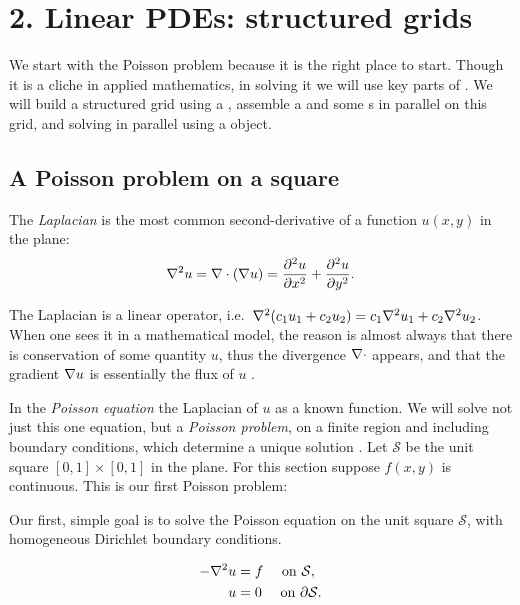
\chapter{2. Linear PDEs: structured grids}

We start with the Poisson problem because it is the right place to start.  Though it is a cliche in applied mathematics, in solving it we will use key parts of \PETSc.  We will build a structured grid using a \PETSc \pDMDA, assemble a \pMat and some \pVec s in parallel on this grid, and solving in parallel using a \pKSP object.

\section{A Poisson problem on a square}

The \emph{Laplacian} is the most common second-derivative of a function $u(x,y)$ in the plane:
    $$\nabla^2 u = \nabla\cdot(\nabla u) = \frac{\partial^2 u}{\partial x^2} + \frac{\partial^2 u}{\partial y^2}.$$

The Laplacian is a linear operator, i.e.~$\nabla^2(c_1 u_1 + c_2 u_2) = c_1 \nabla^2 u_1 + c_2 \nabla^2 u_2$.  When one sees it in a mathematical model, the reason is almost always that there is conservation of some quantity $u$, thus the divergence $\nabla\cdot$ appears, and that the gradient $\nabla u$ is essentially the flux of $u$ \citep{Ockendonetal2003}.  

In the \emph{Poisson equation} the Laplacian of $u$ as a known function.  We will solve not just this one equation, but a \emph{Poisson problem}, on a finite region and including boundary conditions, which determine a unique solution \citep{Evans}.  Let $\mathcal{S}$ be the unit square $[0,1]\times[0,1]$ in the plane.  For this section suppose $f(x,y)$ is continuous.   This is our first Poisson problem:
\begin{marginfigure}
\caption{Our first, simple goal is to solve the Poisson equation on the unit square $\mathcal{S}$, with homogeneous Dirichlet boundary conditions.}
\label{fig:unitsquare}
\end{marginfigure}
\begin{align}
- \nabla^2 u &= f \quad \text{ on } \mathcal{S}, \label{poissonsquare} \\
u &= 0 \quad \text{ on } \partial \mathcal{S}. \notag
\end{align}


